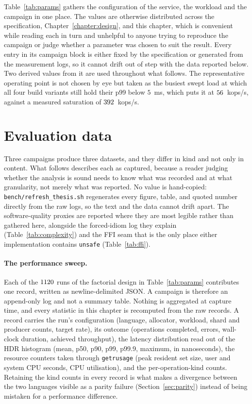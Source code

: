 \documentclass[english,twoside,openright,a4paper,censored,csm,software-track-2020]{HYthesisML}
\begin{document}
Table~\ref{tab:params} gathers the configuration of the service, the workload and the campaign in
one place. The values are otherwise distributed across the specification,
Chapter~\ref{chapter:design}, and this chapter, which is convenient while reading each in turn and
unhelpful to anyone trying to reproduce the campaign or judge whether a parameter was chosen to
suit the result. Every entry in its campaign block is either fixed by the specification or
generated from the measurement logs, so it cannot drift out of step with the data reported below.
Two derived values from it are used throughout what follows. The representative operating point is
not chosen by eye but taken as the busiest swept load at which all four build variants still hold
their p99 below $5$~ms, which puts it at $56$~kops/s, against a measured saturation of
$392$~kops/s.

\section{Evaluation data}
Three campaigns produce three datasets, and they differ in kind and not only in content. What
follows describes each as captured, because a reader judging whether the analysis is sound needs
to know what was recorded and at what granularity, not merely what was reported. No value is
hand-copied: \texttt{bench/refresh\_thesis.sh} regenerates every figure, table, and quoted number
directly from the raw logs, so the text and the data cannot drift apart. The software-quality
proxies are reported where they are most legible rather than gathered here, alongside the
forced-idiom log they explain (Table~\ref{tab:complexity}) and the FFI seam that is the only place
either implementation contains \texttt{unsafe} (Table~\ref{tab:ffi}).

\paragraph{The performance sweep.}
Each of the $1120$ runs of the factorial design in Table~\ref{tab:params} contributes one
record, written as newline-delimited JSON. A campaign is therefore an append-only log and not a
summary table. Nothing is aggregated at capture time, and every statistic in this chapter is
recomputed from the raw records. A record carries the run's configuration (language, allocator,
workload, shard and producer counts, target rate), its outcome (operations completed, errors,
wall-clock duration, achieved throughput), the latency distribution read out of the HDR
histogram (mean, p50, p90, p99, p99.9, maximum, in nanoseconds), the resource counters taken
through \texttt{getrusage} (peak resident set size, user and system CPU seconds, CPU
utilisation), and the per-operation-kind counts. Retaining the kind counts in every record is
what makes a divergence between the two languages visible as a parity failure
(Section~\ref{sec:parity}) instead of being mistaken for a performance difference.
\end{document}
